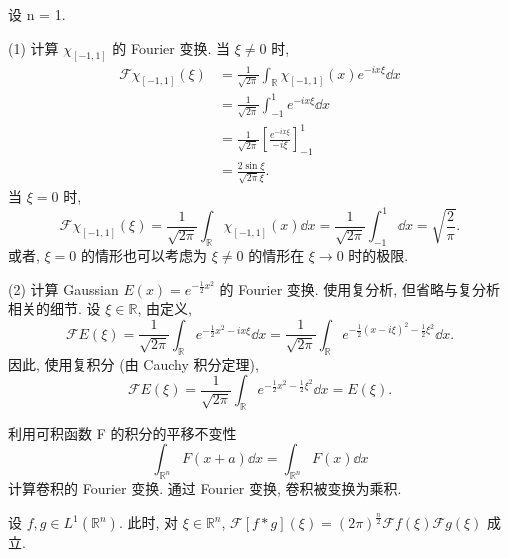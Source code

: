 \begin{example}\label{exa:5.11}
设 n = 1.

(1) 计算 $\chi_{[-1,1]}$ 的 Fourier 变换. 当 $\xi \neq 0$ 时,
\begin{align*}
\mathcal{F}\chi_{[-1,1]}(\xi) &= \frac{1}{\sqrt{2\pi}}\int_{\mathbb{R}}\chi_{[-1,1]}(x)e^{-ix\xi}\dd x \\
&= \frac{1}{\sqrt{2\pi}}\int_{-1}^{1}e^{-ix\xi}\dd x \\
&= \frac{1}{\sqrt{2\pi}}\left[\frac{e^{-ix\xi}}{-i\xi}\right]_{-1}^{1} \\
&= \frac{2\sin\xi}{\sqrt{2\pi}\xi}.
\end{align*}
当 $\xi = 0$ 时,
\[
\mathcal{F}\chi_{[-1,1]}(\xi) = \frac{1}{\sqrt{2\pi}}\int_{\mathbb{R}}\chi_{[-1,1]}(x)\dd x = \frac{1}{\sqrt{2\pi}}\int_{-1}^{1}\dd x = \sqrt{\frac{2}{\pi}}.
\]
或者, $\xi = 0$ 的情形也可以考虑为 $\xi \neq 0$ 的情形在 $\xi \to 0$ 时的极限.

(2) 计算 Gaussian $E(x) = e^{-\frac{1}{2}x^{2}}$ 的 Fourier 变换. 使用复分析, 但省略与复分析相关的细节. 设 $\xi \in \mathbb{R}$, 由定义,
\[
\mathcal{F}E(\xi) = \frac{1}{\sqrt{2\pi}}\int_{\mathbb{R}}e^{-\frac{1}{2}x^{2}-ix\xi}\dd x = \frac{1}{\sqrt{2\pi}}\int_{\mathbb{R}}e^{-\frac{1}{2}(x-i\xi)^{2}-\frac{1}{2}\xi^{2}}\dd x.
\]
因此, 使用复积分 (由 Cauchy 积分定理),
\[
\mathcal{F}E(\xi) = \frac{1}{\sqrt{2\pi}}\int_{\mathbb{R}}e^{-\frac{1}{2}x^{2}-\frac{1}{2}\xi^{2}}\dd x = E(\xi).
\]
\end{example}

利用可积函数 F 的积分的平移不变性
\[
\int_{\mathbb{R}^{n}}F(x+a)\dd x = \int_{\mathbb{R}^{n}}F(x)\dd x
\]
计算卷积的 Fourier 变换. 通过 Fourier 变换, 卷积被变换为乘积.

\begin{theorem}\label{thm:5.4}
设 $f, g \in L^{1}(\mathbb{R}^{n})$. 此时, 对 $\xi \in \mathbb{R}^{n}$, $\mathcal{F}[f*g](\xi) = (2\pi)^{\frac{n}{2}}\mathcal{F}f(\xi)\mathcal{F}g(\xi)$ 成立.
\end{theorem}


